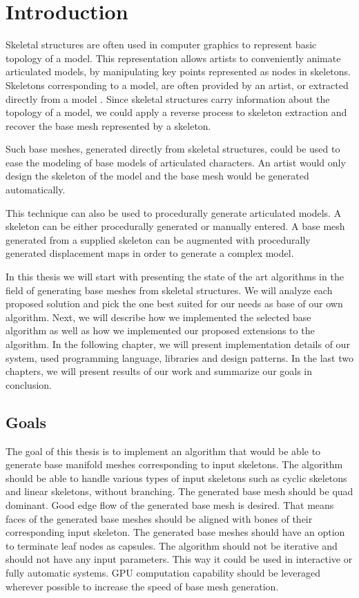 \chapter*{Introduction}

Skeletal structures are often used in computer graphics to represent basic topology of a model.
This representation allows artists to conveniently animate articulated models, by manipulating key points represented as nodes in skeletons.
Skeletons corresponding to a model, are often provided by an artist, or extracted directly from a model \cite{laplac}.
Since skeletal structures carry information about the topology of a model, we could apply a reverse process to skeleton extraction and recover the base mesh represented by a skeleton.

Such base meshes, generated directly from skeletal structures, could be used to ease the modeling of base models of articulated characters.
An artist would only design the skeleton of the model and the base mesh would be generated automatically.

This technique can also be used to procedurally generate articulated models.
A skeleton can be either procedurally generated or manually entered.
A base mesh generated from a supplied skeleton can be augmented with procedurally generated displacement maps in order to generate a complex model.

In this thesis we will start with presenting the state of the art algorithms in the field of generating base meshes from skeletal structures.
We will analyze each proposed solution and pick the one best suited for our needs as base of our own algorithm.
Next, we will describe how we implemented the selected base algorithm as well as how we implemented our proposed extensions to the algorithm.
In the following chapter, we will present implementation details of our system, used programming language, libraries and design patterns.
In the last two chapters, we will present results of our work and summarize our goals in conclusion.

\pagebreak

\section*{Goals}

The goal of this thesis is to implement an algorithm that would be able to generate base manifold meshes corresponding to input skeletons.
The algorithm should be able to handle various types of input skeletons such as cyclic skeletons and linear skeletons, without branching.
The generated base mesh should be quad dominant.
Good edge flow of the generated base mesh is desired.
That means faces of the generated base meshes should be aligned with bones of their corresponding input skeleton.
The generated base meshes should have an option to terminate leaf nodes as capsules.
The algorithm should not be iterative and should not have any input parameters.
This way it could be used in interactive or fully automatic systems.
GPU computation capability should be leveraged wherever possible to increase the speed of base mesh generation.